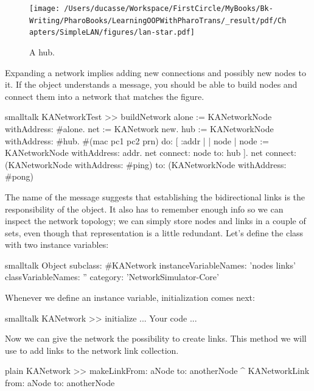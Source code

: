 \documentclass[10pt,twoside,english]{_support/latex/sbabook/sbabook}
\begin{document}
\begin{figure}

\begin{center}
\texttt{[image: /Users/ducasse/Workspace/FirstCircle/MyBooks/Bk-Writing/PharoBooks/LearningOOPWithPharoTrans/\_result/pdf/Chapters/SimpleLAN/figures/lan-star.pdf]}\caption{A hub.\label{hub}}\end{center}
\end{figure}


Expanding a network implies adding new connections and possibly new nodes to it.
If the  object understands a  message, you should be able to build nodes and connect them into a network that matches the figure.

\begin{displaycode}{smalltalk}
KANetworkTest >> buildNetwork
	alone := KANetworkNode withAddress: #alone.
	net := KANetwork new.
	hub := KANetworkNode withAddress: #hub.
	#(mac pc1 pc2 prn)
		do: [ :addr | 
			| node |
			node := KANetworkNode withAddress: addr.
			net connect: node to: hub ].
	net connect: (KANetworkNode withAddress: #ping) to: (KANetworkNode withAddress: #pong)
\end{displaycode}

The name of the  message suggests that establishing the bidirectional links is the responsibility of the  object. It also has to remember enough info so we can inspect the network topology; we can simply store nodes and links in a couple of sets, even though that representation is a little redundant.
Let's define the class with two instance variables:

\begin{displaycode}{smalltalk}
Object subclass: #KANetwork
    instanceVariableNames: 'nodes links'
    classVariableNames: ''
    category: 'NetworkSimulator-Core'
\end{displaycode}

Whenever we define an instance variable, initialization comes next:

\begin{displaycode}{smalltalk}
KANetwork >> initialize
    ... Your code ...
\end{displaycode}

Now we can give the network the possibility to create links.  This method we will use to add links to the network link collection.

\begin{displaycode}{plain}
KANetwork >> makeLinkFrom: aNode to: anotherNode
	^ KANetworkLink from: aNode to: anotherNode
\end{displaycode}
\end{document}
